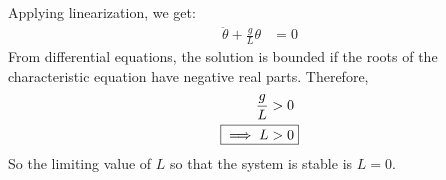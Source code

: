 \subsection{}
Applying linearization, we get:
\begin{align*}
    \ddot{\theta} + \frac{g}{L} \theta &= 0
\end{align*}
From differential equations, the solution is bounded if the roots of the characteristic equation
have negative real parts. Therefore,
\begin{align*}
    \frac{g}{L} &> 0 \\
    \Aboxed{\implies L &> 0}
\end{align*}
So the limiting value of $L$ so that the system is stable is $L = 0$.